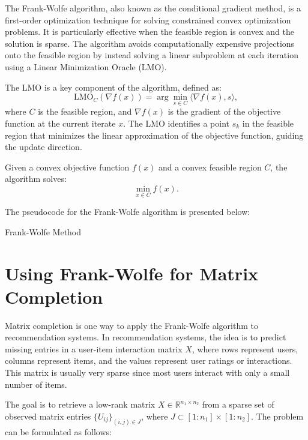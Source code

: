 \documentclass[a4paper, 11pt, reqno]{article} %
\begin{document}
\begin{multicols}{2}
The Frank-Wolfe algorithm, also known as the conditional gradient method, is a first-order optimization technique for solving constrained convex optimization problems. It is particularly effective when the feasible region is convex and the solution is sparse. The algorithm avoids computationally expensive projections onto the feasible region by instead solving a linear subproblem at each iteration using a Linear Minimization Oracle (LMO).

The LMO is a key component of the algorithm, defined as:
\[
\text{LMO}_C(\nabla f(x)) = \arg\min_{s \in C} \langle \nabla f(x), s \rangle,
\]
where \(C\) is the feasible region, and \(\nabla f(x)\) is the gradient of the objective function at the current iterate \(x\). The LMO identifies a point \(s_k\) in the feasible region that minimizes the linear approximation of the objective function, guiding the update direction.

Given a convex objective function \(f(x)\) and a convex feasible region \(C\), the algorithm solves:
\[
\min_{x \in C} f(x).
\]

The pseudocode for the Frank-Wolfe algorithm is presented below:

\begin{algorithm}[H]
\caption{Frank-Wolfe Method}
\For{\(k = 0, 1, \dots\)}{
    Compute \(s_k = \arg\min_{s \in C} \langle \nabla f(x_k), s \rangle\) using LMO\;
    Set direction \(d_k^{FW} = s_k - x_k\)\;
    Choose step size \(\alpha_k \in (0, 1]\)\;
    Update \(x_{k+1} = x_k + \alpha_k d_k^{FW}\)\;
    \If{stopping condition is met}{break\;}
}
\end{algorithm}

\section{Using Frank-Wolfe for Matrix Completion}

Matrix completion is one way to apply the Frank-Wolfe algorithm to recommendation systems. In recommendation systems, the idea is to predict missing entries in a user-item interaction matrix \(X\), where rows represent users, columns represent items, and the values represent user ratings or interactions. This matrix is usually very sparse since most users interact with only a small number of items.

The goal is to retrieve a low-rank matrix \(X \in \mathbb{R}^{n_1 \times n_2}\) from a sparse set of observed matrix entries \(\{U_{ij}\}_{(i,j) \in J}\), where \(J \subset [1:n_1] \times [1:n_2]\). The problem can be formulated as follows\cite{doi:10.1137/15M104726X}:


\end{multicols}
\end{document}
